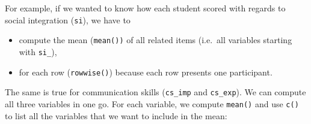 \documentclass[
]{book}
\begin{document}
For example, if we wanted to know how each student scored with regards to social integration (\texttt{si}), we have to

\begin{itemize}
\item
  compute the mean (\texttt{mean())} of all related items (i.e.~all variables starting with \texttt{si\_}),
\item
  for each row (\texttt{rowwise()}) because each row presents one participant.
\end{itemize}

The same is true for communication skills (\texttt{cs\_imp} and \texttt{cs\_exp}). We can compute all three variables in one go. For each variable, we compute \texttt{mean()} and use \texttt{c()} to list all the variables that we want to include in the mean:
\end{document}

